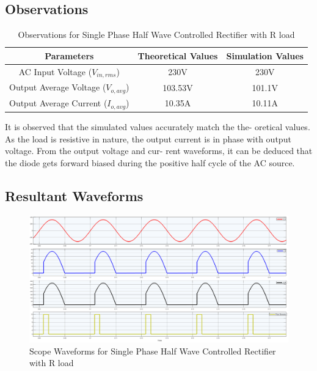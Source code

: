 \subsection{Observations}

\begin{table}[h]
    \renewcommand{\arraystretch}{1.3}
    \caption{Observations for Single Phase Half Wave Controlled Rectifier with R load}
    \label{table_observation_5}
    \centering
    \begin{tabular}{|c|c|c|}
        \hline
        Parameters                              & Theoretical Values & Simulation Values \\
        \hline
        \hline
        AC Input Voltage ($ V_{in,rms} $)       & 230V               & 230V              \\
        \hline
        Output Average Voltage ($ V_{o,avg} $)  & 103.53V            & 101.1V            \\
        \hline
        Output Average Current ($ I_{o,avg}  $) & 10.35A             & 10.11A            \\
        \hline
    \end{tabular}
\end{table}


It is observed that the simulated values accurately match the the-
oretical values. As the load is resistive in nature, the output current
is in phase with output voltage. From the output voltage and cur-
rent waveforms, it can be deduced that the diode gets forward biased
during the positive half cycle of the AC source.

\pagebreak


\subsection{Resultant Waveforms}

\begin{figure}[h]
    \centering
    \includegraphics[width=1\textwidth]{images/experiment-1/circuit-scope-simulation-05.png}
    \caption{Scope Waveforms for Single Phase Half Wave Controlled Rectifier with R load}
    \label{Fig_waveform_single-phase-half-wave-controlled-rectifier-with-R-load}
\end{figure}

\pagebreak
